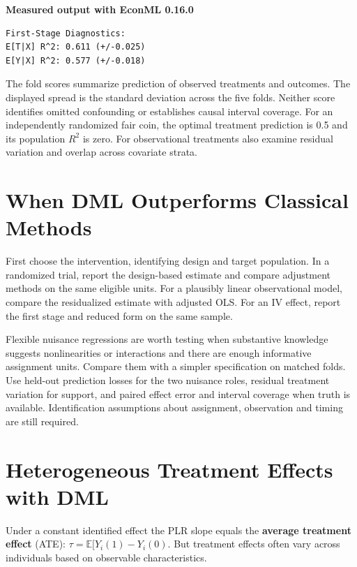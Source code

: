 \textbf{Measured output with EconML 0.16.0}

\begin{verbatim}
First-Stage Diagnostics:
E[T|X] R^2: 0.611 (+/-0.025)
E[Y|X] R^2: 0.577 (+/-0.018)
\end{verbatim}

The fold scores summarize prediction of observed treatments and outcomes.
The displayed spread is the standard deviation across the five folds.
Neither score identifies omitted confounding or establishes causal interval
coverage. For an independently randomized fair coin, the optimal treatment
prediction is 0.5 and its population $R^2$ is zero. For observational
treatments also examine residual variation and overlap across covariate strata.

\section{When DML Outperforms Classical Methods}\label{_when_dml_outperforms_classical_methods}

First choose the intervention, identifying design and target population. In a
randomized trial, report the design-based estimate and compare adjustment
methods on the same eligible units. For a plausibly linear observational
model, compare the residualized estimate with adjusted OLS. For an IV
effect, report the first stage and reduced form on the same sample.

Flexible nuisance regressions are worth testing when substantive knowledge
suggests nonlinearities or interactions and there are enough informative
assignment units. Compare them with a simpler specification on matched folds.
Use held-out prediction losses for the two nuisance roles, residual treatment
variation for support, and paired effect error and interval coverage when
truth is available. Identification assumptions about assignment, observation
and timing are still required.

\section{Heterogeneous Treatment Effects with
DML}\label{_heterogeneous_treatment_effects_with_dml}

Under a constant identified effect the PLR slope equals the \textbf{average treatment effect} (ATE):
\(\tau = \mathbb{E}[Y_i(1) - Y_i(0)\). But treatment effects often
vary across individuals based on observable characteristics.


